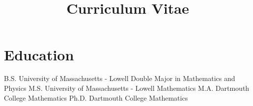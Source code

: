 \documentclass[a4paper,sans]{moderncv}
\title{Curriculum Vitae}
\begin{document}
    \makecvtitle
    \vspace{-8ex}
    \section{Education}
            {B.S.}
            {University of Massachusetts - Lowell}
            {}
            {}
            {Double Major in Mathematics and Physics}
            {M.S.}
            {University of Massachusetts - Lowell}
            {}
            {}
            {Mathematics}
            {M.A.}
            {Dartmouth College}
            {}
            {}
            {Mathematics}
            {Ph.D.}
            {Dartmouth College}
            {}
            {}
            {Mathematics}
\end{document}
